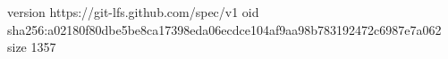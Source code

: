 version https://git-lfs.github.com/spec/v1
oid sha256:a02180f80dbe5be8ca17398eda06ecdce104af9aa98b783192472c6987e7a062
size 1357

